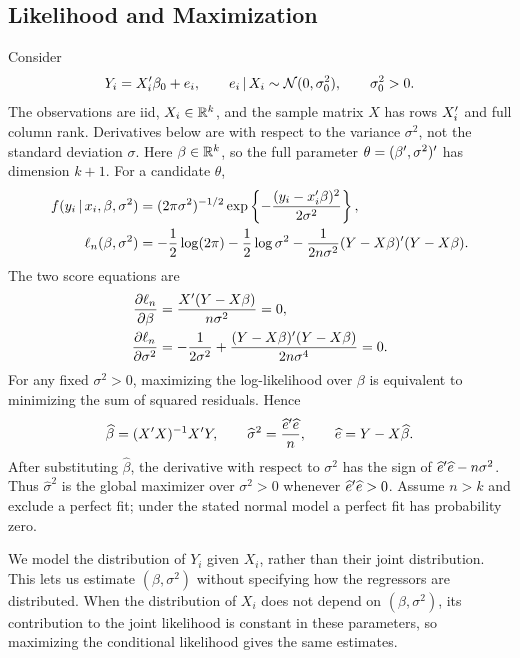 \documentclass[a4paper,12pt]{article}
\begin{document}
\subsection{Likelihood and Maximization}

Consider
\begin{align}
	Y_i=X_i^{\prime}\beta_0+e_i,
	\qquad e_i\mathpunct{}|\mathpunct{} X_i\sim\operatorname{\mathcal{N}}(0,\sigma_0^2),
	\qquad \sigma_0^2>0.
\end{align}
The observations are \gls{iid}, $X_i\in\mathbb{R}^k$,
and the sample matrix $X$ has rows $X_i^{\prime}$ and full column rank.
Derivatives below are with respect to the variance $\sigma^2$,
not the standard deviation $\sigma$.
Here $\beta\in\mathbb{R}^k$, so the full parameter $\theta=(\beta^{\prime},\sigma^2)^{\prime}$ has dimension $k+1$.
For a candidate $\theta$,
\begin{align}
	f(y_i\mathpunct{}|\mathpunct{} x_i,\beta,\sigma^2)
	&=(2\pi \sigma^2)^{-1/2}\exp\left\{-\frac{(y_i-x_i^{\prime}\beta)^2}{2\sigma^2}\right\},\\
	\ell_n(\beta,\sigma^2)
	&=-\frac12\log(2\pi)-\frac12\log \sigma^2
	-\frac1{2n\sigma^2}(Y-X\beta)^{\prime}(Y-X\beta).
\end{align}
The two score equations are
\begin{align}
	\frac{\partial\ell_n}{\partial\beta}
	&=\frac{X^{\prime}(Y-X\beta)}{n\sigma^2}=0,\\
	\frac{\partial\ell_n}{\partial \sigma^2}
	&=-\frac1{2\sigma^2}+\frac{(Y-X\beta)^{\prime}(Y-X\beta)}{2n\sigma^4}=0.
\end{align}
For any fixed $\sigma^2>0$, maximizing the log-likelihood over $\beta$ is equivalent to minimizing
the sum of squared residuals. Hence
\begin{align}\label{eq-normal-mle}
	\widehat\beta=(X^{\prime} X)^{-1} X^{\prime} Y,
	\qquad
	\widehat\sigma^2=\frac{\widehat e^{\prime}\widehat e}{n},
	\qquad \widehat e=Y-X\widehat\beta.
\end{align}
After substituting $\widehat\beta$, the derivative with respect to $\sigma^2$ has the sign of
$\widehat e^{\prime}\widehat e-n\sigma^2$.
Thus $\widehat\sigma^2$ is the global maximizer over $\sigma^2>0$ whenever $\widehat e^{\prime}\widehat e>0$.
Assume $n>k$ and exclude a perfect fit; under the stated normal model a perfect fit has probability zero.

\begin{remark}
	We model the distribution of $Y_i$ given $X_i$, rather than their joint distribution.
	This lets us estimate $(\beta,\sigma^2)$ without specifying how the regressors are distributed.
	When the distribution of $X_i$ does not depend on $(\beta,\sigma^2)$,
	its contribution to the joint likelihood is constant in these parameters,
	so maximizing the conditional likelihood gives the same estimates.
\end{remark}
\end{document}
